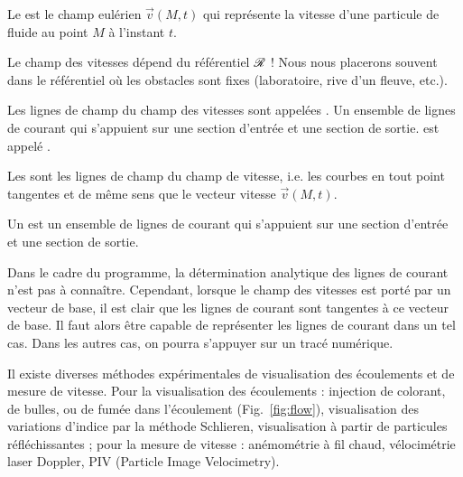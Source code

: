 \documentclass[12pt,fancy]{cours}
\begin{document}
\begin{definition}\label{def:}
  Le  est le champ eulérien $\Vec{v}(M,t)$ qui représente la vitesse d'une particule de fluide au point $M$ à l'instant $t$. 
\end{definition}
\begin{remarque}
  Le champ des vitesses dépend du référentiel $\mathcal{R}$ ! Nous nous placerons souvent dans le référentiel où les obstacles sont fixes (laboratoire, rive d'un fleuve, etc.).
\end{remarque}
Les lignes de champ du champ des vitesses sont appelées . Un ensemble de lignes de courant qui s'appuient sur une section d'entrée et une section de sortie. est appelé .
\begin{definition}\label{def:}
  Les  sont les lignes de champ du champ de vitesse, i.e. les courbes en tout point tangentes et de même sens que le vecteur vitesse $\Vec{v}(M,t)$. 


  Un  est un ensemble de lignes de courant qui s'appuient sur une section d'entrée et une section de sortie.
  
\end{definition}
Dans le cadre du programme, la détermination analytique des lignes de courant n'est pas à connaître. Cependant, lorsque le champ des vitesses est porté par un vecteur de base, il est clair que les lignes de courant sont tangentes à ce vecteur de base. Il faut alors être capable de représenter les lignes de courant dans un tel cas. Dans les autres cas, on pourra s'appuyer sur un tracé numérique.


\begin{remarque}
  Il existe diverses méthodes expérimentales de visualisation des écoulements et de mesure de vitesse. Pour la visualisation des écoulements : injection de colorant, de bulles, ou de fumée dans l'écoulement (Fig.~\ref{fig:flow}), visualisation des variations d'indice par la méthode Schlieren, visualisation à partir de particules réfléchissantes ; pour la mesure de vitesse : anémométrie à fil chaud, vélocimétrie laser Doppler, PIV (Particle Image Velocimetry).
\end{remarque}
\end{document}
